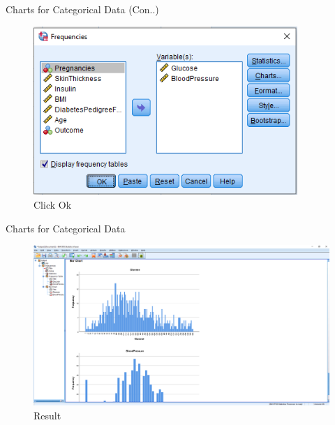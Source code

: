 \begin{frame}[t]{Charts for Categorical Data (Con..)}
	\begin{figure}
		\centering
		\includegraphics[width=10cm]{img/freq_charts_3}
		\caption{Click Ok}
	\end{figure}
\end{frame}
\begin{frame}[t]{Charts for Categorical Data}
	\begin{figure}
		\centering
		\includegraphics[width=12cm]{img/freq_charts_4}
		\caption{Result}
	\end{figure}
\end{frame}


